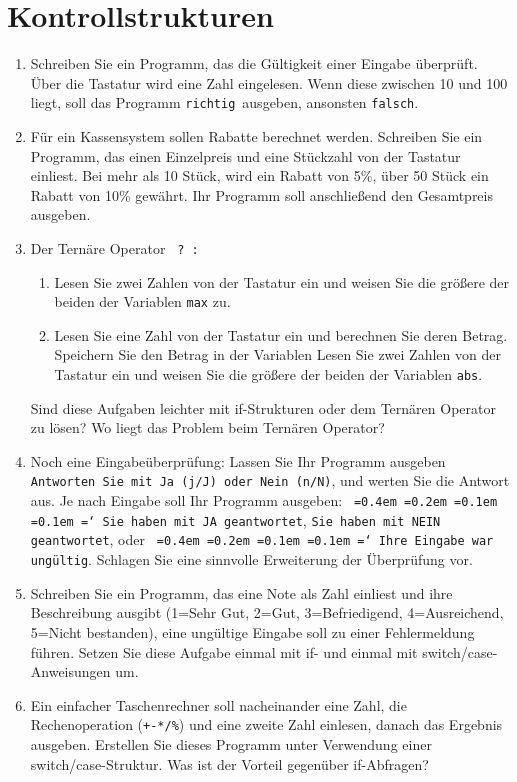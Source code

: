 \documentclass[paper=a4, fontsize=11pt, twoside]{scrartcl}
\newcommand*\justify{%
  \fontdimen2\font=0.4em%
  \fontdimen3\font=0.2em%
  \fontdimen4\font=0.1em%
  \fontdimen7\font=0.1em%
  \hyphenchar\font=`\-%
}
\begin{document}
\section*{Kontrollstrukturen}
\begin{enumerate}[resume]
  \item Schreiben Sie ein Programm, das die Gültigkeit einer Eingabe überprüft. Über die Tastatur wird eine Zahl eingelesen. Wenn diese zwischen 10 und 100 liegt, soll das Programm \glqq \texttt{richtig}\grqq\, ausgeben, ansonsten \glqq \texttt{falsch}\grqq.%
  \item Für ein Kassensystem sollen Rabatte berechnet werden. Schreiben Sie ein Programm, das einen Einzelpreis und eine Stückzahl von der Tastatur einliest. Bei mehr als 10 Stück, wird ein Rabatt von 5\%, über 50 Stück ein Rabatt von 10\% gewährt. Ihr Programm soll anschließend den Gesamtpreis ausgeben.
  \item Der Ternäre Operator \texttt{ ? :}
   \begin{enumerate}
    \item Lesen Sie zwei Zahlen von der Tastatur ein und weisen Sie die größere der beiden der Variablen \texttt{max} zu.
    \item Lesen Sie eine Zahl von der Tastatur ein und berechnen Sie deren Betrag. Speichern Sie den Betrag in der Variablen Lesen Sie zwei Zahlen von der Tastatur ein und weisen Sie die größere der beiden der Variablen \texttt{abs}.
   \end{enumerate}
   Sind diese Aufgaben leichter mit if-Strukturen oder dem Ternären Operator zu lösen? Wo liegt das Problem beim Ternären Operator?
  \item Noch eine Eingabeüberprüfung: Lassen Sie Ihr Programm ausgeben \glqq \texttt{Antworten Sie mit Ja (j/J) oder Nein (n/N)}\grqq , und werten Sie die Antwort aus. Je nach Eingabe soll Ihr Programm ausgeben: \glqq \texttt{\justify Sie haben mit JA geantwortet}\grqq, \glqq \texttt{Sie haben mit NEIN geantwortet}\grqq, oder \glqq \texttt{\justify Ihre Eingabe war ungültig}\grqq. Schlagen Sie eine sinnvolle Erweiterung der Überprüfung vor.
  \item Schreiben Sie ein Programm, das eine Note als Zahl einliest und ihre Beschreibung ausgibt (1=Sehr Gut, 2=Gut, 3=Befriedigend, 4=Ausreichend, 5=Nicht bestanden), eine ungültige Eingabe soll zu einer Fehlermeldung führen. Setzen Sie diese Aufgabe einmal mit if- und einmal mit switch/case-Anweisungen um.
  \item Ein einfacher Taschenrechner soll nacheinander eine Zahl, die Rechenoperation (\texttt{+-*/\%}) und eine zweite Zahl einlesen, danach das Ergebnis ausgeben. Erstellen Sie dieses Programm unter Verwendung einer switch/case-Struktur. Was ist der Vorteil gegenüber if-Abfragen?
  
\end{enumerate}
\end{document}
